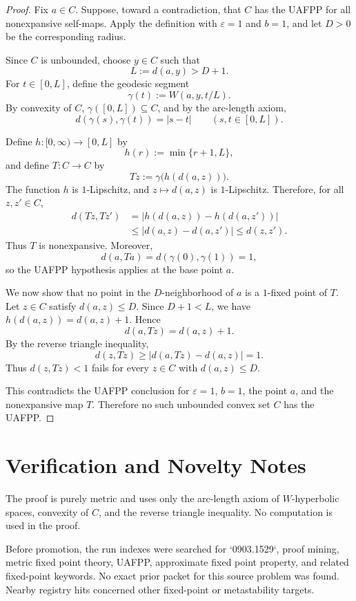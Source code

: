 \documentclass[11pt]{article}
\newcommand{\eps}{\varepsilon}
\begin{document}
\begin{proof}
Fix $a\in C$. Suppose, toward a contradiction, that $C$ has the UAFPP for all
nonexpansive self-maps. Apply the definition with $\eps=1$ and $b=1$, and let
$D>0$ be the corresponding radius.

Since $C$ is unbounded, choose $y\in C$ such that
\[
  L:=d(a,y)>D+1.
\]
For $t\in[0,L]$, define the geodesic segment
\[
  \gamma(t):=W(a,y,t/L).
\]
By convexity of $C$, $\gamma([0,L])\subseteq C$, and by the arc-length axiom,
\[
  d(\gamma(s),\gamma(t))=|s-t|
  \qquad (s,t\in[0,L]).
\]

Define $h:[0,\infty)\to[0,L]$ by
\[
  h(r):=\min\{r+1,L\},
\]
and define $T:C\to C$ by
\[
  Tz:=\gamma\bigl(h(d(a,z))\bigr).
\]
The function $h$ is $1$-Lipschitz, and $z\mapsto d(a,z)$ is $1$-Lipschitz.
Therefore, for all $z,z'\in C$,
\[
\begin{aligned}
  d(Tz,Tz')
  &=
  \bigl|h(d(a,z))-h(d(a,z'))\bigr| \\
  &\le |d(a,z)-d(a,z')|
   \le d(z,z').
\end{aligned}
\]
Thus $T$ is nonexpansive. Moreover,
\[
  d(a,Ta)=d(\gamma(0),\gamma(1))=1,
\]
so the UAFPP hypothesis applies at the base point $a$.

We now show that no point in the $D$-neighborhood of $a$ is a $1$-fixed point
of $T$. Let $z\in C$ satisfy $d(a,z)\le D$. Since $D+1<L$, we have
$h(d(a,z))=d(a,z)+1$. Hence
\[
  d(a,Tz)=d(a,z)+1.
\]
By the reverse triangle inequality,
\[
  d(z,Tz)\ge |d(a,Tz)-d(a,z)|=1.
\]
Thus $d(z,Tz)<1$ fails for every $z\in C$ with $d(a,z)\le D$.

This contradicts the UAFPP conclusion for $\eps=1$, $b=1$, the point $a$, and
the nonexpansive map $T$. Therefore no such unbounded convex set $C$ has the
UAFPP.
\end{proof}

\section*{Verification and Novelty Notes}

The proof is purely metric and uses only the arc-length axiom of
$W$-hyperbolic spaces, convexity of $C$, and the reverse triangle inequality.
No computation is used in the proof.

Before promotion, the run indexes were searched for `0903.1529`, proof mining,
metric fixed point theory, UAFPP, approximate fixed point property, and related
fixed-point keywords. No exact prior packet for this source problem was found.
Nearby registry hits concerned other fixed-point or metastability targets.
\end{document}
